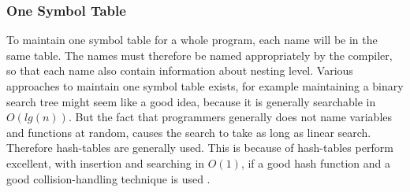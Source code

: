 \subsubsection*{One Symbol Table}
To maintain one symbol table for a whole program, each name will be in the same table. The names must therefore be named appropriately by the compiler, so that each name also contain information about nesting level. Various approaches to maintain one symbol table exists, for example maintaining a binary search tree might seem like a good idea, because it is generally searchable in $O(lg(n))$. But the fact that programmers generally does not name variables and functions at random, causes the search to take as long as linear search. Therefore hash-tables are generally used. This is because of hash-tables perform excellent, with insertion and searching in $O(1)$, if a good hash function and a good collision-handling technique is used \citep{sebesta}.